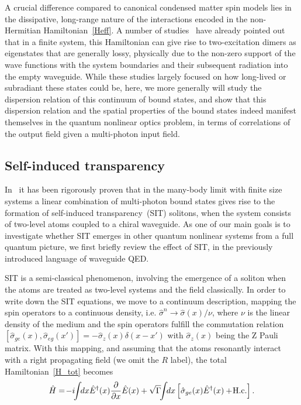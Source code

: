 \documentclass[pra,twocolumn,showpacs,preprintnumbers,amsmath,amssymb]{revtex4-1}
\begin{document}
A crucial difference compared to canonical condensed matter spin models lies in the dissipative, long-range nature of the interactions encoded in the non-Hermitian Hamiltonian~\eqref{Heff}. A number of studies~\cite{dimermolmer1,dimermolmer2,dimer_shermet,dimer_poddu} have already pointed out that in a finite system, this Hamiltonian can give rise to two-excitation dimers as eigenstates that are generally lossy, physically due to the non-zero support of the wave functions with the system boundaries and their subsequent radiation into the empty waveguide. While these studies largely focused on how long-lived or subradiant these states could be, here, we more generally will study the dispersion relation of this continuum of bound states, and show that this dispersion relation and the spatial properties of the bound states indeed manifest themselves in the quantum nonlinear optics problem, in terms of correlations of the output field given a multi-photon input field.  

 
 
 \subsection{Self-induced transparency}\label{Sec.SIT}

In~\cite{mahmo_calajo} it has been rigorously proven that in the many-body limit with finite size systems a linear combination of multi-photon bound states gives rise to the formation of self-induced transparency~(SIT) solitons, when the system consists of two-level atoms coupled to a chiral waveguide. As one of our main goals is to investigate whether SIT emerges in other quantum nonlinear systems from a full quantum picture, we first briefly review the effect of SIT, in the previously introduced language of waveguide QED.

SIT is a semi-classical phenomenon, involving the emergence of a soliton when the atoms are treated as two-level systems and the field classically. 
In order to write down the SIT equations, we move to a continuum description, mapping the spin operators to a continuous density, i.e. $\hat \sigma^n\rightarrow \hat \sigma(x)/\nu$, where $\nu$ is the linear density of the medium  and the spin operators fulfill the commutation relation $[\hat \sigma_{ge}(x),\hat \sigma_{eg}(x')]=-\hat \sigma_{z}(x)\delta(x-x')$ with $\hat \sigma_{z}(x)$ being the Z Pauli matrix. With this mapping, and assuming that the atoms resonantly interact with a right propagating field (we omit the $R$ label),
the total Hamiltonian~\eqref{H_tot} becomes
\begin{equation}\label{H_tot_cont}
\hat H=\!-i\!\!\int\!\! dx\hat E^{\dagger}(x)\frac{\partial}{\partial x}\hat E(x)+\sqrt{\Gamma}\!\!\int\!\! dx\left[\hat\sigma_{ge}(x)\hat E^{\dagger}(x)+ \!\rm H.c.\right].
\end{equation}
\end{document}
